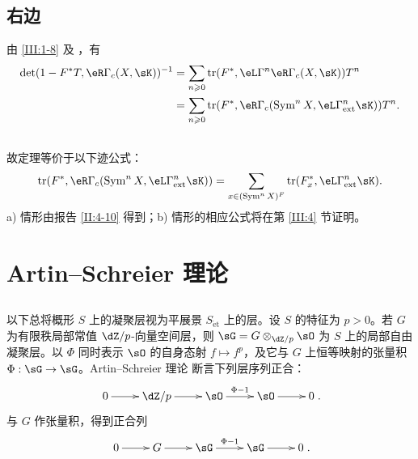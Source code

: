 \subsection{右边}\label{III:2-12}
由 \ref{III:1-8} 及 \cite[XVII 5.5.21]{sga4}，有
\begin{align*}
\det(1-F^*T,\eR\Gamma_c(X,\sK))^{-1}
&=\sum_{n\geqslant0}\tr(F^*,\eL\Gamma^n\eR\Gamma_c(X,\sK))T^n\\
&=\sum_{n\geqslant0}\tr(F^*,\eR\Gamma_c(\operatorname{Sym}^nX,\eL\Gamma_{\mathrm{ext}}^n\sK))T^n.
\end{align*}
\subsection{}\label{III:2-13}
故定理等价于以下迹公式：
\[\tr(F^*,\eR\Gamma_c(\operatorname{Sym}^nX,\eL\Gamma_{\mathrm{ext}}^n\sK))
=\sum_{x\in(\operatorname{Sym}^nX)^F}\tr(F_x^*,\eL\Gamma_{\mathrm{ext}}^n\sK).\]
a) 情形由报告 \ref{II:4-10} 得到；b) 情形的相应公式将在第 \ref{III:4} 节证明。

\section{Artin--Schreier 理论}\label{III:3}
\subsection{}\label{III:3-1}
以下总将概形 $S$ 上的凝聚层视为平展景 $S_{\mathrm{\acute et}}$ 上的层。设 $S$ 的特征为 $p>0$。若 $G$ 为有限秩局部常值 $\dZ/p$-向量空间层，则 $\sG=G\otimes_{\dZ/p}\sO$ 为 $S$ 上的局部自由凝聚层。以 $\Phi$ 同时表示 $\sO$ 的自身态射 $f\mapsto f^p$，及它与 $G$ 上恒等映射的张量积 $\Phi:\sG\to\sG$。Artin--Schreier 理论 \cite[IX 3.5]{sga4} 断言下列层序列正合：
\[\xymatrix{0\ar[r]&\dZ/p\ar[r]&\sO\ar[r]^-{\Phi-1}&\sO\ar[r]&0}.\]
与 $G$ 作张量积，得到正合列
\[\xymatrix{0\ar[r]&G\ar[r]&\sG\ar[r]^-{\Phi-1}&\sG\ar[r]&0}.\]

